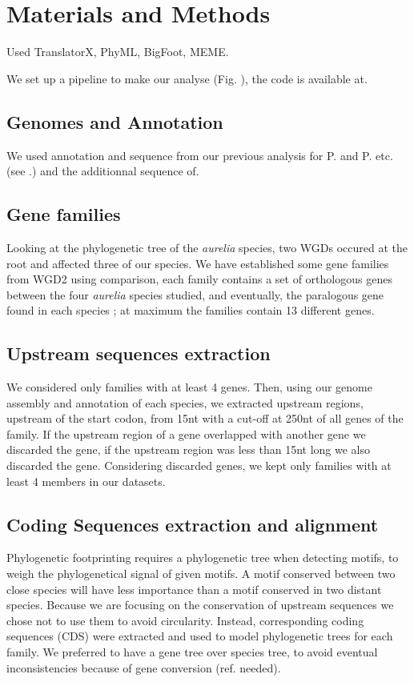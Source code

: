 \section*{Materials and Methods}

Used TranslatorX, PhyML, BigFoot, MEME.

We set up a pipeline to make our analyse (Fig. ), the code is available at.

\subsection*{Genomes and Annotation}

We used annotation and sequence from our previous analysis for P. and P. etc. (see .) and the additionnal sequence of.

\subsection*{Gene families}

Looking at the phylogenetic tree of the \textit{aurelia} species, two WGDs occured at the root and affected three of our species. We have established some gene families from WGD2 using comparison, each family contains a set of orthologous genes between the four \textit{aurelia} species studied, and eventually, the paralogous gene found in each species ; at maximum the families contain 13 different genes. 

\subsection*{Upstream sequences extraction}

We considered only families with at least 4 genes. Then, using our genome assembly and annotation of each species, we extracted upstream regions, upstream of the start codon, from 15nt with a cut-off at 250nt of all genes of the family. If the upstream region of a gene overlapped with another gene we discarded the gene, if the upstream region was less than 15nt long we also discarded the gene. Considering discarded genes, we kept only families with at least 4 members in our datasets.

\subsection*{Coding Sequences extraction and alignment}

Phylogenetic footprinting requires a phylogenetic tree when detecting motifs, to weigh the phylogenetical signal of given motifs. A motif conserved between two close species will have less importance than a motif conserved in two distant species. Because we are focusing on the conservation of upstream sequences we chose not to use them to avoid circularity. Instead, corresponding coding sequences (CDS) were extracted and used to model phylogenetic trees for each family. We preferred to have a gene tree over species tree, to avoid eventual inconsistencies because of gene conversion (ref. needed).

